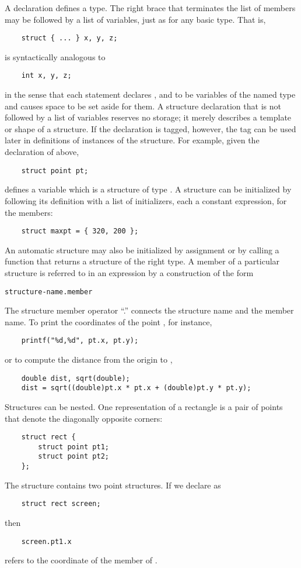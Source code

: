 A  declaration defines a type. The right brace that terminates the list of members may be followed by a list of variables, just as for any basic type.
That is,
\begin{lstlisting}
	struct { ... } x, y, z;
\end{lstlisting}
is syntactically analogous to
\begin{lstlisting}
	int x, y, z;
\end{lstlisting}
in the sense that each statement declares ,  and  to be variables of the named type and causes space to be set aside for them.
A structure declaration that is not followed by a list of variables reserves no storage; it merely describes a template or shape of a structure.
If the declaration is tagged, however, the tag can be used later in definitions of instances of the structure.
For example, given the declaration of  above,
\begin{lstlisting}
	struct point pt;
\end{lstlisting}
defines a variable  which is a structure of type .
A structure can be initialized by following its definition with a list of initializers, each a constant expression, for the members:
\begin{lstlisting}
	struct maxpt = { 320, 200 };
\end{lstlisting}
An automatic structure may also be initialized by assignment or by calling a function that returns a structure of the right type.
A member of a particular structure is referred to in an expression by a construction of the form
\begin{lstlisting}[basicstyle=\ttfamily\normalsize\itshape, keywordstyle=\color{black}]
	structure-name.member
\end{lstlisting}
The structure member operator ``.'' connects the structure name and the member name.
To print the coordinates of the point , for instance,
\begin{lstlisting}
	printf("%d,%d", pt.x, pt.y);
\end{lstlisting}
or to compute the distance from the origin  to ,
\begin{lstlisting}
	double dist, sqrt(double);
	dist = sqrt((double)pt.x * pt.x + (double)pt.y * pt.y);
\end{lstlisting}
Structures can be nested. One representation of a rectangle is a pair of points that denote the diagonally opposite corners:
\begin{lstlisting}
	struct rect {
		struct point pt1;
		struct point pt2;
	};
\end{lstlisting}
The  structure contains two point structures. If we declare  as
\begin{lstlisting}
	struct rect screen;
\end{lstlisting}
then
\begin{lstlisting}
	screen.pt1.x
\end{lstlisting}
refers to the  coordinate of the  member of .



